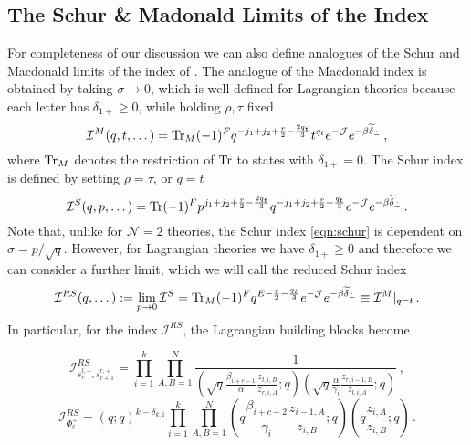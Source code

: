 \documentclass[main.tex]{subfiles}
\begin{document}
\subsection{The Schur \& Madonald Limits of the Index}
For completeness of our discussion we can also define analogues of the Schur and Macdonald limits of the index of \cite{Gadde:2011uv}. 
The analogue of the Macdonald index is obtained by taking $\sigma\to0$, which is well defined for Lagrangian theories because each letter has $\delta_{1+}\geq0$, while holding $\rho,\tau$ fixed
\begin{equation}
\mathcal{I}^M(q,t,\dots)=\operatorname{Tr}_M(-1)^Fq^{-j_1+j_2+\frac{r}{2}-\frac{2q_t}{3}}t^{q_{t}}e^{-\mathcal{J}}e^{-\beta\widetilde{\delta}_{\dot-}}\,,
\end{equation} 
where $\operatorname{Tr}_{M}$ denotes the restriction of $\operatorname{Tr}$ to states with $\delta_{1+}=0$.
The Schur index is defined by setting $\rho=\tau$, or $q=t$
\begin{equation}\label{eqn:schur}
\mathcal{I}^S(q,p,\dots)=\operatorname{Tr}(-1)^Fp^{j_1+j_2+\frac{r}{2}-\frac{2q_t}{3}}q^{-j_1+j_2+\frac{r}{2}+\frac{q_t}{3}}e^{-\mathcal{J}}e^{-\beta\widetilde{\delta}_{\dot-}}
 \,.
\end{equation} 
Note that, unlike for $\mathcal{N}=2$ theories, the Schur index \eqref{eqn:schur} is dependent on $\sigma=p/\sqrt{q}$. However, for Lagrangian theories we have $\delta_{1+}\geq0$ and therefore we can consider a further limit, which we will call the reduced Schur index
\begin{equation}\label{eqn:redschur}
\mathcal{I}^{RS}(q,\dots):=\lim_{p\to0}\mathcal{I}^S=\operatorname{Tr}_{M}(-1)^Fq^{E-\frac{r}{2}-\frac{q_t}{3}}e^{-\mathcal{J}}e^{-\beta\widetilde{\delta}_{\dot-}}\equiv \mathcal{I}^M|_{q=t}\,.
\end{equation} 
In particular, for the index $\mathcal{I}^{RS}$, the Lagrangian building blocks become

\begin{equation}
\mathcal{I}^{RS}_{s_{c}^{l,+},s_{c+1}^{r,+}}=\prod_{i=1}^k\prod_{A,B=1}^N\frac{1}{\left(\sqrt{q}\frac{\beta_{i+c-1}}{\alpha}\frac{z_{l,i,B}}{z_{r,i,A}};q\right)\left(\sqrt{q}\frac{\alpha}{\gamma_i}\frac{z_{r,i-1,B}}{z_{l,i,A}};q\right)}\,,
\end{equation}
\begin{equation}
\mathcal{I}_{\Phi^+_c}^{RS}=(q;q)^{k-\delta_{k,1}}\prod_{i=1}^k\prod_{A,B=1}^N\left(q\frac{\beta_{i+c-2}}{\gamma_i}\frac{z_{i-1,A}}{z_{i,B}};q\right)\left(q\frac{z_{i,A}}{z_{i,B}};q\right)\,.
\end{equation}
\end{document}

